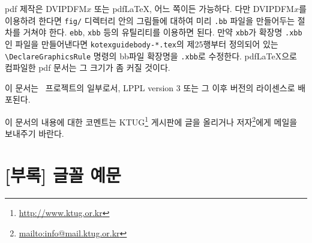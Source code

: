 pdf 제작은 DVIPDFM$x$ 또는 pdf\LaTeX, 어느 쪽이든 가능하다. 다만
DVIPDFM$x$를 이용하려 한다면 \texttt{fig/} 디렉터리 안의 그림들에
대하여 미리 \texttt{.bb} 파일을 만들어두는 절차를 거쳐야 한다. \texttt{ebb},
\texttt{xbb} 등의 유틸리티를 이용하면 된다. 만약 \texttt{xbb}가
확장명 \texttt{.xbb}인 파일을 만들어낸다면 \texttt{kotexguidebody-*.tex}의
제25행부터 정의되어 있는 \verb|\DeclareGraphicsRule| 명령의
bb파일 확장명을 \texttt{.xbb}로 수정한다. 
pdf\LaTeX 으로 컴파일한 pdf 문서는 그 크기가 좀 커질 것이다.

이 문서는 \kotex~프로젝트의 일부로서,
LPPL version 3 또는 그 이후 버전의 라이센스로 배포된다.

이 문서의 내용에 대한 코멘트는 KTUG\footnote{\url{http://www.ktug.or.kr}}
게시판에 글을 올리거나 저자\footnote{\url{mailto:info@mail.ktug.or.kr}}에게
메일을 보내주기 바란다.

\ifEUCmode\else
\clearpage{}
\section*{[부록] 글꼴 예문}

\parindent=0pt

\newcommand\teststring{%
막차는 좀처럼 오지 않았다./
대합실 밖에는 밤새 송이눈이 쌓이고/
흰 보라 수수꽃 눈시린 유리창마다/
톱밥 난로가 지펴지고 있었다./
그믐처럼 몇은 졸고/
몇은 감기에 쿨럭이고/
그리웠던 순간들을 생각하며 나는/
한 줌의 톱밥을 불빛 속에 던져 주었다.}

\newcommand\testbstring{%
\par\bfseries 막차는 좀처럼 오지 않았다./
대합실 밖에는 밤새 송이눈이 쌓이고/
흰 보라 수수꽃 눈시린 유리창마다/
톱밥 난로가 지펴지고 있었다./
그믐처럼 몇은 졸고/
몇은 감기에 쿨럭이고/
그리웠던 순간들을 생각하며 나는/
한 줌의 톱밥을 불빛 속에 던져 주었다.}

\newcommand\testhstring{%
\par
學而時習之, 不亦說乎.}

\newcommand\testhbstring{%
\par
\bfseries 學而時習之, 不亦說乎.}

\def\fnttest#1{%
  \begingroup\SetAdhocFonts{ut#1}{utbt}\teststring\endgroup}

\def\fnttstB#1{%
  \begingroup\SetAdhocFonts{ut#1}{utbt}\testbstring\endgroup}
\def\fnthjtst#1{%
  \begingroup\SetAdhocFonts{utbt}{ut#1}\testhstring\endgroup}
\def\fnthjtstB#1{%
  \begingroup\SetAdhocFonts{utbt}{ut#1}\testhbstring\endgroup}

